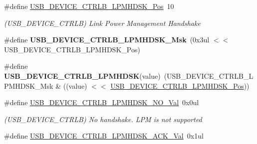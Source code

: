 \begin{DoxyCompactItemize}
\item 
\hypertarget{group___s_a_m_l21___u_s_b_ga7bbe2998f650533b2cc87bb63f7a28de}{}\#define \hyperlink{group___s_a_m_l21___u_s_b_ga7bbe2998f650533b2cc87bb63f7a28de}{U\+S\+B\+\_\+\+D\+E\+V\+I\+C\+E\+\_\+\+C\+T\+R\+L\+B\+\_\+\+L\+P\+M\+H\+D\+S\+K\+\_\+\+Pos}~10\label{group___s_a_m_l21___u_s_b_ga7bbe2998f650533b2cc87bb63f7a28de}

\begin{DoxyCompactList}\small\item\em (U\+S\+B\+\_\+\+D\+E\+V\+I\+C\+E\+\_\+\+C\+T\+R\+L\+B) Link Power Management Handshake \end{DoxyCompactList}\item 
\hypertarget{group___s_a_m_l21___u_s_b_gad54d31b65a2471f0f9932bf93317119b}{}\#define {\bfseries U\+S\+B\+\_\+\+D\+E\+V\+I\+C\+E\+\_\+\+C\+T\+R\+L\+B\+\_\+\+L\+P\+M\+H\+D\+S\+K\+\_\+\+Msk}~(0x3ul $<$$<$ U\+S\+B\+\_\+\+D\+E\+V\+I\+C\+E\+\_\+\+C\+T\+R\+L\+B\+\_\+\+L\+P\+M\+H\+D\+S\+K\+\_\+\+Pos)\label{group___s_a_m_l21___u_s_b_gad54d31b65a2471f0f9932bf93317119b}

\item 
\hypertarget{group___s_a_m_l21___u_s_b_ga145da777e9fe034938c2cc897276ba0d}{}\#define {\bfseries U\+S\+B\+\_\+\+D\+E\+V\+I\+C\+E\+\_\+\+C\+T\+R\+L\+B\+\_\+\+L\+P\+M\+H\+D\+S\+K}(value)~(U\+S\+B\+\_\+\+D\+E\+V\+I\+C\+E\+\_\+\+C\+T\+R\+L\+B\+\_\+\+L\+P\+M\+H\+D\+S\+K\+\_\+\+Msk \& ((value) $<$$<$ \hyperlink{group___s_a_m_l21___u_s_b_ga7bbe2998f650533b2cc87bb63f7a28de}{U\+S\+B\+\_\+\+D\+E\+V\+I\+C\+E\+\_\+\+C\+T\+R\+L\+B\+\_\+\+L\+P\+M\+H\+D\+S\+K\+\_\+\+Pos}))\label{group___s_a_m_l21___u_s_b_ga145da777e9fe034938c2cc897276ba0d}

\item 
\hypertarget{group___s_a_m_l21___u_s_b_gaead1ace8b3c95e077a583fc16f732901}{}\#define \hyperlink{group___s_a_m_l21___u_s_b_gaead1ace8b3c95e077a583fc16f732901}{U\+S\+B\+\_\+\+D\+E\+V\+I\+C\+E\+\_\+\+C\+T\+R\+L\+B\+\_\+\+L\+P\+M\+H\+D\+S\+K\+\_\+\+N\+O\+\_\+\+Val}~0x0ul\label{group___s_a_m_l21___u_s_b_gaead1ace8b3c95e077a583fc16f732901}

\begin{DoxyCompactList}\small\item\em (U\+S\+B\+\_\+\+D\+E\+V\+I\+C\+E\+\_\+\+C\+T\+R\+L\+B) No handshake. L\+P\+M is not supported \end{DoxyCompactList}\item 
\hypertarget{group___s_a_m_l21___u_s_b_ga579aa1294380225d109d6ee2a2d4727d}{}\#define \hyperlink{group___s_a_m_l21___u_s_b_ga579aa1294380225d109d6ee2a2d4727d}{U\+S\+B\+\_\+\+D\+E\+V\+I\+C\+E\+\_\+\+C\+T\+R\+L\+B\+\_\+\+L\+P\+M\+H\+D\+S\+K\+\_\+\+A\+C\+K\+\_\+\+Val}~0x1ul\label{group___s_a_m_l21___u_s_b_ga579aa1294380225d109d6ee2a2d4727d}


\end{DoxyCompactItemize}

